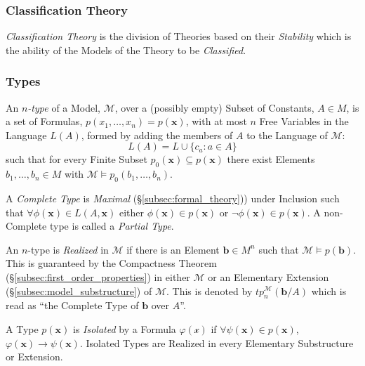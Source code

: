 \documentclass{article}
\begin{document}
\subsubsection{Classification Theory}

\emph{Classification Theory} is the division of Theories based on
their \emph{Stability} which is the ability of the Models of the
Theory to be \emph{Classified}.

\subsubsection{Types}

An \emph{$n$-type} of a Model, $\mathcal{M}$, over a (possibly empty)
Subset of Constants, $A \in M$, is a set of Formulas,
$p(x_1,\ldots,x_n) = p(\mathbf{x})$, with at most $n$ Free Variables
in the Language $L(A)$, formed by adding the members of $A$ to the
Language of $\mathcal{M}$:
\[
    L(A) = L \cup \{ c_a : a \in A \}
\]
such that for every Finite Subset $p_0(\mathbf{x}) \subseteq
p(\mathbf{x})$ there exist Elements $b_1,\ldots,b_n \in M$ with
$\mathcal{M} \vDash p_0(b_1,\ldots,b_n)$.

A \emph{Complete Type} is \emph{Maximal}
(\S\ref{subsec:formal_theory})) under Inclusion such that $\forall
\phi(\mathbf{x}) \in L(A,\mathbf{x})$ either $\phi(\mathbf{x}) \in
p(\mathbf{x})$ or $\neg \phi(\mathbf{x}) \in p(\mathbf{x})$. A
non-Complete type is called a \emph{Partial Type}.

An $n$-type is \emph{Realized} in $\mathcal{M}$ if there is an Element
$\mathbf{b} \in M^n$ such that $\mathcal{M} \vDash
p(\mathbf{b})$. This is guaranteed by the Compactness Theorem
(\S\ref{subsec:first_order_properties}) in either $\mathcal{M}$ or an
Elementary Extension (\S\ref{subsec:model_substructure}) of
$\mathcal{M}$. This is denoted by $tp_{n}^{\mathcal{M}}(\mathbf{b}/A)$
which is read as ``the Complete Type of $\mathbf{b}$ over $A$''.

A Type $p(\mathbf{x})$ is \emph{Isolated} by a Formula
$\varphi(\mathcal{x})$ if $\forall \psi(\mathbf{x}) \in
p(\mathbf{x})$, $\varphi (\mathbf{x}) \rightarrow
\psi(\mathbf{x})$. Isolated Types are Realized in every Elementary
Substructure or Extension.
\end{document}
